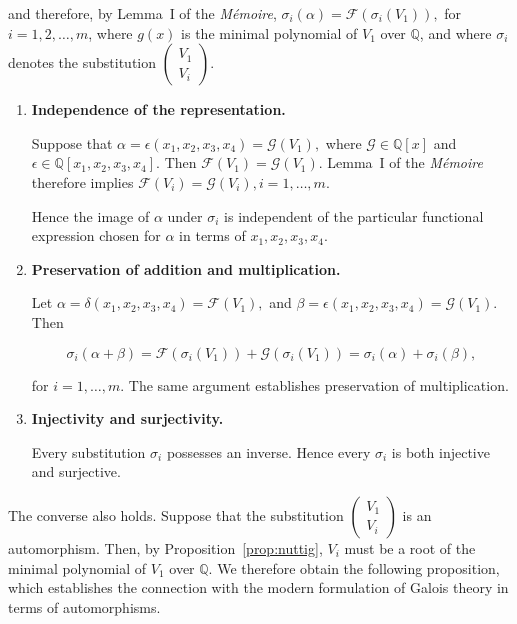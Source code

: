 \documentclass[a4paper,11pt]{article}
\begin{document}
 and therefore, by Lemma~I of the \textit{Mémoire},
  \(
 \sigma_i(\alpha)
 =
 \mathcal{F}(\sigma_i(V_1)),
 \)
  for \(i=1,2,\dots,m\), where \(g(x)\) is the minimal polynomial of \(V_1\) over \(\mathbb{Q}\), and where \(\sigma_i\) denotes the substitution
  \(
 \begin{pmatrix}
 	V_1\\
 	V_i
 \end{pmatrix}.
 \)
 
 \begin{enumerate}
 	
 	\item \textbf{Independence of the representation.}
 	
 	Suppose that
 	 	\(
 	\alpha
 	=
 	\epsilon(x_1,x_2,x_3,x_4)
 	=
 	\mathcal{G}(V_1),
 	\)
 	 	where
 	\(\mathcal{G}\in\mathbb{Q}[x]\) and
 	\(\epsilon\in\mathbb{Q}[x_1,x_2,x_3,x_4]\). Then
 	 	\(
 	\mathcal{F}(V_1)=\mathcal{G}(V_1).
 	\)
 	Lemma~I of the \textit{Mémoire} therefore implies
 	\(
 	\mathcal{F}(V_i)=\mathcal{G}(V_i),
 		i=1,\dots,m.
 	\)
 	
 	Hence the image of \(\alpha\) under \(\sigma_i\) is independent of the particular functional expression chosen for \(\alpha\) in terms of \(x_1,x_2,x_3,x_4\).
 	
 	\item \textbf{Preservation of addition and multiplication.}
 	
 	Let
 	\(
 	\alpha
 	=
 	\delta(x_1,x_2,x_3,x_4)
 	=
 	\mathcal{F}(V_1),
 	\)
 	 	and
 	 	\(
 	\beta
 	=
 	\epsilon(x_1,x_2,x_3,x_4)
 	=
 	\mathcal{G}(V_1).
 	\)
 	 	Then
 	
 	\[
 	\sigma_i(\alpha+\beta)
 	=
 	\mathcal{F}(\sigma_i(V_1))
 	+
 	\mathcal{G}(\sigma_i(V_1))
 	=
 	\sigma_i(\alpha)
 	+
 	\sigma_i(\beta),
 	\]
 	
 	for \(i=1,\dots,m\). The same argument establishes preservation of multiplication.
 	
 	\item \textbf{Injectivity and surjectivity.}
 	
 	Every substitution \(\sigma_i\) possesses an inverse. Hence every \(\sigma_i\) is both injective and surjective.
 	
 \end{enumerate}


  The converse also holds. Suppose that the substitution
  \(
 \begin{pmatrix}
 	V_1\\
 	V_i
 \end{pmatrix}
 \) 
 is an automorphism. Then, by Proposition~\ref{prop:nuttig}, \(V_i\) must be a root of the minimal polynomial of \(V_1\) over \(\mathbb{Q}\). We therefore obtain the following proposition, which establishes the connection with the modern formulation of Galois theory in terms of automorphisms.
 
\end{document}
